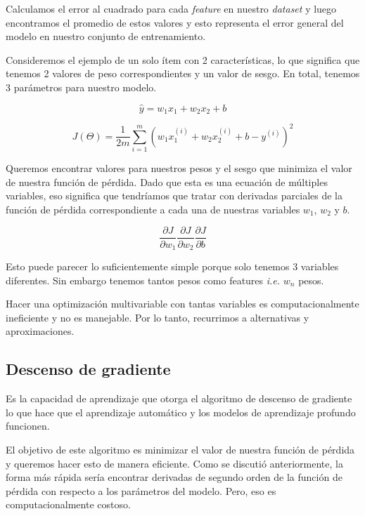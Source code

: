 \documentclass[a4paper,12pt]{article}
\begin{document}
Calculamos el error al cuadrado para cada \textit{feature} en nuestro \textit{dataset} y luego encontramos el promedio de estos valores y esto representa el error general del modelo en nuestro conjunto de entrenamiento.

Consideremos el ejemplo de un solo ítem con 2 características, lo que significa que tenemos 2 valores de peso correspondientes y un valor de sesgo. En total, tenemos 3 parámetros para nuestro modelo.

\begin{equation}
	\hat{y} = w_1x_1 + w_2x_2 + b
\end{equation}

\begin{equation}
	J(\Theta)=\frac{1}{2m} \sum_{i=1}^{m} (w_1x_1^{(i)}+w_2x_2^{(i)}+b-y^{(i)})^2
\end{equation}

\clearpage

Queremos encontrar valores para nuestros pesos y el sesgo que minimiza el valor de nuestra función de pérdida. Dado que esta es una ecuación de múltiples variables, eso significa que tendríamos que tratar con derivadas parciales de la función de pérdida correspondiente a cada una de nuestras variables $w_1$, $w_2$ y $b$.

\begin{equation}
	\frac{\partial J}{\partial w_1} \frac{\partial J}{\partial w_2}
	\frac{\partial J}{\partial b}
\end{equation}

Esto puede parecer lo suficientemente simple porque solo tenemos 3 variables diferentes.
Sin embargo tenemos tantos pesos como features \textit{i.e.} $w_n$ pesos.

Hacer una optimización multivariable con tantas variables es computacionalmente ineficiente y no es manejable. Por lo tanto, recurrimos a alternativas y aproximaciones.

\subsection{Descenso de gradiente}

Es la capacidad de aprendizaje que otorga el algoritmo de descenso de gradiente lo que hace que el aprendizaje automático y los modelos de aprendizaje profundo funcionen.

El objetivo de este algoritmo es minimizar el valor de nuestra función de pérdida y queremos hacer esto de manera eficiente.
Como se discutió anteriormente, la forma más rápida sería encontrar derivadas de segundo orden de la función de pérdida con respecto a los parámetros del modelo. Pero, eso es computacionalmente costoso.
\end{document}

